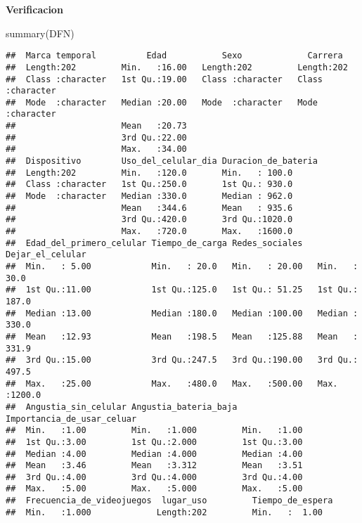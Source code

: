 \documentclass[
]{article}
\newenvironment{Shaded}{\begin{snugshade}}{\end{snugshade}}
\newcommand{\FunctionTok}[1]{\textcolor[rgb]{0.00,0.00,0.00}{#1}}
\newcommand{\NormalTok}[1]{#1}
\begin{document}
\textbf{Verificacion}

\begin{Shaded}
\begin{Highlighting}[]
\FunctionTok{summary}\NormalTok{(DFN)}
\end{Highlighting}
\end{Shaded}

\begin{verbatim}
##  Marca temporal          Edad           Sexo             Carrera         
##  Length:202         Min.   :16.00   Length:202         Length:202        
##  Class :character   1st Qu.:19.00   Class :character   Class :character  
##  Mode  :character   Median :20.00   Mode  :character   Mode  :character  
##                     Mean   :20.73                                        
##                     3rd Qu.:22.00                                        
##                     Max.   :34.00                                        
##  Dispositivo        Uso_del_celular_dia Duracion_de_bateria
##  Length:202         Min.   :120.0       Min.   : 100.0     
##  Class :character   1st Qu.:250.0       1st Qu.: 930.0     
##  Mode  :character   Median :330.0       Median : 962.0     
##                     Mean   :344.6       Mean   : 935.6     
##                     3rd Qu.:420.0       3rd Qu.:1020.0     
##                     Max.   :720.0       Max.   :1600.0     
##  Edad_del_primero_celular Tiempo_de_carga Redes_sociales   Dejar_el_celular
##  Min.   : 5.00            Min.   : 20.0   Min.   : 20.00   Min.   :  30.0  
##  1st Qu.:11.00            1st Qu.:125.0   1st Qu.: 51.25   1st Qu.: 187.0  
##  Median :13.00            Median :180.0   Median :100.00   Median : 330.0  
##  Mean   :12.93            Mean   :198.5   Mean   :125.88   Mean   : 331.9  
##  3rd Qu.:15.00            3rd Qu.:247.5   3rd Qu.:190.00   3rd Qu.: 497.5  
##  Max.   :25.00            Max.   :480.0   Max.   :500.00   Max.   :1200.0  
##  Angustia_sin_celular Angustia_bateria_baja Importancia_de_usar_celuar
##  Min.   :1.00         Min.   :1.000         Min.   :1.00              
##  1st Qu.:3.00         1st Qu.:2.000         1st Qu.:3.00              
##  Median :4.00         Median :4.000         Median :4.00              
##  Mean   :3.46         Mean   :3.312         Mean   :3.51              
##  3rd Qu.:4.00         3rd Qu.:4.000         3rd Qu.:4.00              
##  Max.   :5.00         Max.   :5.000         Max.   :5.00              
##  Frecuencia_de_videojuegos  lugar_uso         Tiempo_de_espera
##  Min.   :1.000             Length:202         Min.   :  1.00  

\end{verbatim}
\end{document}
